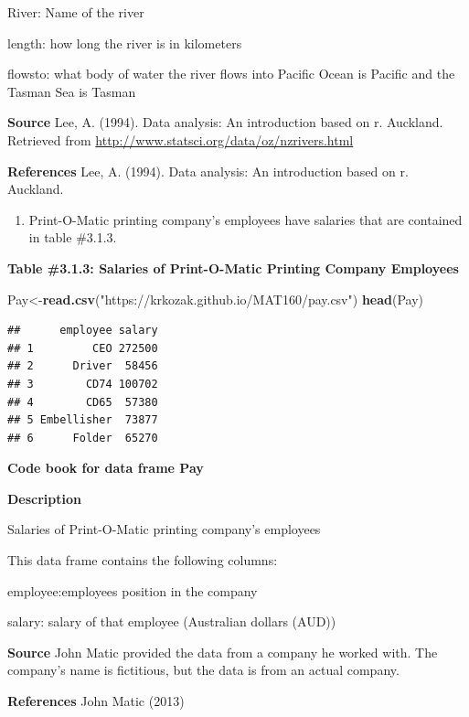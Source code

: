 \documentclass[
]{book}
\newenvironment{Shaded}{\begin{snugshade}}{\end{snugshade}}
\newcommand{\KeywordTok}[1]{\textcolor[rgb]{0.13,0.29,0.53}{\textbf{#1}}}
\newcommand{\NormalTok}[1]{#1}
\newcommand{\StringTok}[1]{\textcolor[rgb]{0.31,0.60,0.02}{#1}}
\providecommand{\tightlist}{%
  \setlength{\itemsep}{0pt}\setlength{\parskip}{0pt}}
\begin{document}
River: Name of the river

length: how long the river is in kilometers

flowsto: what body of water the river flows into Pacific Ocean is Pacific and the Tasman Sea is Tasman

\textbf{Source}
Lee, A. (1994). Data analysis: An introduction based on r. Auckland. Retrieved from
\url{http://www.statsci.org/data/oz/nzrivers.html}

\textbf{References}
Lee, A. (1994). Data analysis: An introduction based on r. Auckland.

\begin{enumerate}
\def\labelenumi{\arabic{enumi}.}
\setcounter{enumi}{2}
\tightlist
\item
  Print-O-Matic printing company's employees have salaries that are contained in table \#3.1.3.
\end{enumerate}

\textbf{Table \#3.1.3: Salaries of Print-O-Matic Printing Company Employees}

\begin{Shaded}
\begin{Highlighting}[]
\NormalTok{Pay<-}\KeywordTok{read.csv}\NormalTok{(}\StringTok{"https://krkozak.github.io/MAT160/pay.csv"}\NormalTok{)}
\KeywordTok{head}\NormalTok{(Pay)}
\end{Highlighting}
\end{Shaded}

\begin{verbatim}
##      employee salary
## 1         CEO 272500
## 2      Driver  58456
## 3        CD74 100702
## 4        CD65  57380
## 5 Embellisher  73877
## 6      Folder  65270
\end{verbatim}

\textbf{Code book for data frame Pay}

\textbf{Description}

Salaries of Print-O-Matic printing company's employees

This data frame contains the following columns:

employee:employees position in the company

salary: salary of that employee (Australian dollars (AUD))

\textbf{Source}
John Matic provided the data from a company he worked with. The company's name is fictitious, but the data is from an actual company.

\textbf{References}
John Matic (2013)
\end{document}
